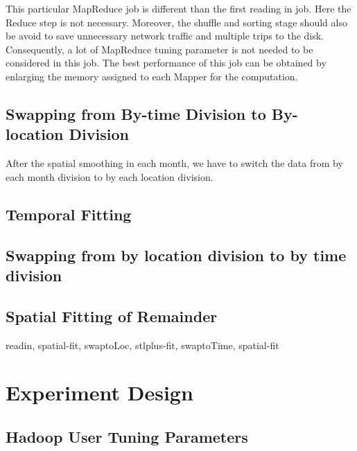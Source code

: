 This particular MapReduce job is different than the first reading in job. Here
the Reduce step is not necessary. Moreover, the shuffle and sorting stage should
also be avoid to save unnecessary network traffic and multiple trips to the disk.
Consequently, a lot of MapReduce tuning parameter is not needed to be considered
in this job. The best performance of this job can be obtained by enlarging the 
memory assigned to each Mapper for the computation.

\subsection{Swapping from By-time Division to By-location Division}

After the spatial smoothing in each month, we have to switch the data from by 
each month division to by each location division. 



\subsection{Temporal Fitting}

\subsection{Swapping from by location division to by time division}

\subsection{Spatial Fitting of Remainder}

readin, spatial-fit, swaptoLoc, stlplus-fit, swaptoTime, spatial-fit



\section{Experiment Design}

\subsection{Hadoop User Tuning Parameters}

